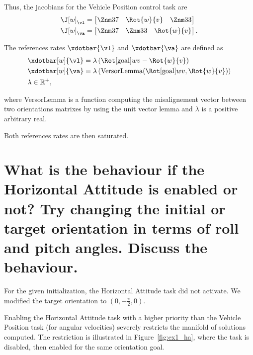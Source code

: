 \begin{questions}
\begin{parts}
\begin{solutionorbox}
			Thus, the jacobians for the Vehicle Position control task are
			\begin{align*}
				&\J[w]_{\vl} =
				\begin{bmatrix}
					\Znm37\quad
					\Rot{w}{v}\quad
					\Znm33
				\end{bmatrix}\\
				&\J[w]_{\va} =
				\begin{bmatrix}
					\Znm37\quad
					\Znm33\quad
					\Rot{w}{v}
				\end{bmatrix}
				\mathrm{.}
			\end{align*}
			
			The references rates $\xdotbar{\vl}$ and
			$\xdotbar{\va}$ are defined as
			\begin{align*}
				&\xdotbar[w]{\vl} =
				\lambda\left(\Rot[\mathrm{goal}]{w}{v} -
				\Rot{w}{v}\right)
				\\
				&\xdotbar[w]{\va} =
				\lambda\left(\mathrm{VersorLemma}(\Rot[\mathrm{goal}]{w}{v},
				\Rot{w}{v})\right)
				\\
				&\lambda\in\mathbb{R}^+
				\mathrm{,}
			\end{align*}

			where VersorLemma is a function computing the
			misalignement vector between two orientations matrixes
			by using the unit vector lemma and $\lambda$ is a
			positive arbitrary real.

			Both references rates are then saturated.

		\end{solutionorbox}
		\part{What is the behaviour if the Horizontal Attitude is enabled
			or not? Try changing the initial or target orientation in terms of roll and
		pitch angles. Discuss the behaviour.}

		\begin{solutionorbox}
			For the given initialization, the Horizontal Attitude
			task did not activate. We modified the target
			orientation to $\left(0, -\frac{\pi}{2}, 0\right)$.

			Enabling the Horizontal Attitude task with a higher
			priority than the Vehicle Position task (for angular
			velocities) severely restricts the manifold of solutions
			computed. The restriction is illustrated in
			Figure~\ref{fig:ex1_ha}, where the task is disabled,
			then enabled for the same orientation goal.


\end{solutionorbox}
\end{parts}
\end{questions}
